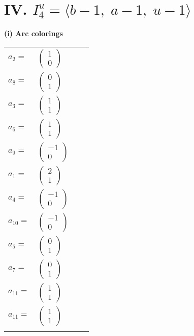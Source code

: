 \documentclass[1p]{elsarticle_modified}
\theoremstyle{definition}
\begin{document}
\centering \section*{IV. $I^u_{4}= \langle b-1,\;a-1,\;u-1 \rangle$}
\flushleft \textbf{(i) Arc colorings}\\
\begin{tabular}{m{7pt} m{180pt} m{7pt} m{180pt} }
\flushright $a_{2}=$&$\begin{pmatrix}1\\0\end{pmatrix}$ \\
\flushright $a_{8}=$&$\begin{pmatrix}0\\1\end{pmatrix}$ \\
\flushright $a_{3}=$&$\begin{pmatrix}1\\1\end{pmatrix}$ \\
\flushright $a_{6}=$&$\begin{pmatrix}1\\1\end{pmatrix}$ \\
\flushright $a_{9}=$&$\begin{pmatrix}-1\\0\end{pmatrix}$ \\
\flushright $a_{1}=$&$\begin{pmatrix}2\\1\end{pmatrix}$ \\
\flushright $a_{4}=$&$\begin{pmatrix}-1\\0\end{pmatrix}$ \\
\flushright $a_{10}=$&$\begin{pmatrix}-1\\0\end{pmatrix}$ \\
\flushright $a_{5}=$&$\begin{pmatrix}0\\1\end{pmatrix}$ \\
\flushright $a_{7}=$&$\begin{pmatrix}0\\1\end{pmatrix}$ \\
\flushright $a_{11}=$&$\begin{pmatrix}1\\1\end{pmatrix}$\\ \flushright $a_{11}=$&$\begin{pmatrix}1\\1\end{pmatrix}$\\&\end{tabular}
\end{document}
